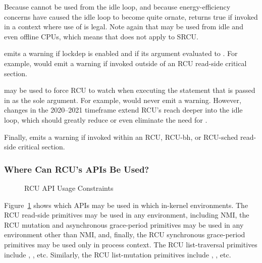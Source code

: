 \QuickQuizEnd

Because  cannot be used from the idle loop,
and because energy-efficiency concerns have caused the idle loop
to become quite ornate,  returns true if
invoked in a context where use of  is legal.
Note again that  may be used from idle and
even offline CPUs, which means that  does not
apply to SRCU\@.

 emits a warning if lockdep is enabled and if
its argument evaluated to .
For example,  would emit a
warning if invoked outside of an RCU read-side critical section.

 may be used to force RCU to watch when executing
the statement that is passed in as the sole argument.
For example, 
would never emit a warning.
However, changes in the 2020--2021 timeframe extend RCU's reach deeper
into the idle loop, which should greatly reduce or even eliminate the
need for .

Finally,   emits a warning if invoked within
an RCU, RCU-bh, or RCU-sched read-side critical section.

\subsubsection{Where Can RCU's APIs Be Used?}
\label{sec:defer:Where Can RCU's APIs Be Used?}

\begin{figure}[tb]
\centering
{}
\caption{RCU API Usage Constraints}
\label{fig:defer:RCU API Usage Constraints}
\end{figure}

Figure~\ref{fig:defer:RCU API Usage Constraints}
shows which APIs may be used in which in-kernel environments.
The RCU read-side primitives may be used in any environment, including NMI,
the RCU mutation and asynchronous grace-period primitives may be used in any
environment other than NMI, and, finally, the RCU synchronous grace-period
primitives may be used only in process context.
The RCU list-traversal primitives include ,
, etc.
Similarly, the RCU list-mutation primitives include
, , etc.

